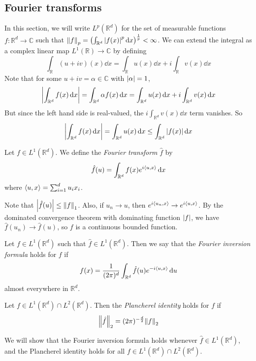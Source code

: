 \subsection{Fourier transforms}
In this section, we will write \( L^p(\mathbb R^d) \) for the set of measurable functions \( f \colon \mathbb R^d \to \mathbb C \) such that \( \norm{f}_p = \qty(\int_{\mathbb R^d} \abs{f(x)}^p \dd{x})^{\frac 1p} < \infty \).
We can extend the integral as a complex linear map \( L^1(\mathbb R) \to \mathbb C \) by defining
\[ \int_{\mathbb R} (u + iv)(x) \dd{x} = \int_{\mathbb R} u(x) \dd{x} + i \int_{\mathbb R} v(x) \dd{x} \]
Note that for some \( u + iv = \alpha \in \mathbb C \) with \( \abs{\alpha} = 1 \),
\[ \abs{\int_{\mathbb R^d} f(x) \dd{x}} = \int_{\mathbb R^d} \alpha f(x) \dd{x} = \int_{\mathbb R^d} u(x) \dd{x} + i \int_{\mathbb R^d} v(x) \dd{x} \]
But since the left hand side is real-valued, the \( i \int_{\mathbb R^d} v(x) \dd{x} \) term vanishes.
So
\[ \abs{\int_{\mathbb R^d} f(x) \dd{x}} = \int_{\mathbb R^d} u(x) \dd{x} \leq \int_{\mathbb R^d} \abs{f(x)} \dd{x} \]
\begin{definition}
	Let \( f \in L^1(\mathbb R^d) \).
	We define the \emph{Fourier transform} \( \hat f \) by
	\[ \hat f(u) = \int_{\mathbb R^d} f(x) e^{i\left\langle{u,x}\right\rangle} \dd{x} \]
	where \( \left\langle{u,x}\right\rangle = \sum_{i=1}^d u_i x_i \).
\end{definition}
\begin{remark}
	Note that \( \abs{\hat f(u)} \leq \norm{f}_1 \).
	Also, if \( u_n \to u \), then \( e^{i\left\langle{u_n,x}\right\rangle} \to e^{i\left\langle{u,x}\right\rangle} \).
	By the dominated convergence theorem with dominating function \( \abs{f} \), we have \( \hat f(u_n) \to \hat f(u) \), so \( f \) is a continuous bounded function.
\end{remark}
\begin{definition}
	Let \( f \in L^1(\mathbb R^d) \) such that \( \hat f \in L^1(\mathbb R^d) \).
	Then we say that the \emph{Fourier inversion formula} holds for \( f \) if
	\[ f(x) = \frac{1}{(2\pi)^d} \int_{\mathbb R^d} \hat f(u) e^{-i\left\langle{u,x}\right\rangle} \dd{u} \]
	almost everywhere in \( \mathbb R^d \).
\end{definition}
\begin{definition}
	Let \( f \in L^1(\mathbb R^d) \cap L^2(\mathbb R^d) \).
	Then the \emph{Plancherel identity} holds for \( f \) if
	\[ \norm{\hat f}_2 = (2\pi)^{-\frac d2} \norm{f}_2 \]
\end{definition}
We will show that the Fourier inversion formula holds whenever \( \hat f \in L^1(\mathbb R^d) \), and the Plancherel identity holds for all \( f \in L^1(\mathbb R^d) \cap L^2(\mathbb R^d) \).

